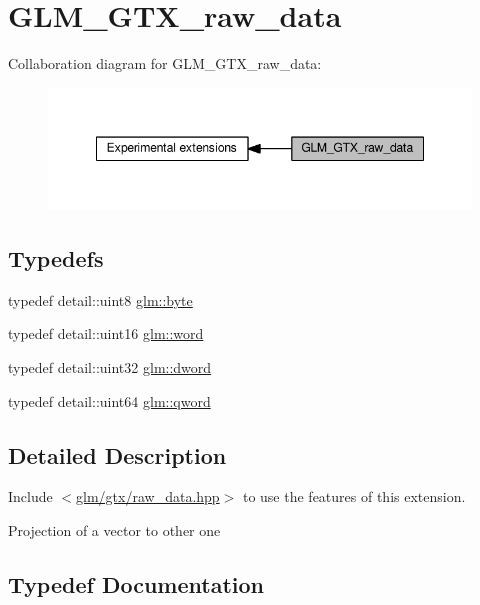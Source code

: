 \hypertarget{group__gtx__raw__data}{}\section{G\+L\+M\+\_\+\+G\+T\+X\+\_\+raw\+\_\+data}
\label{group__gtx__raw__data}
Collaboration diagram for G\+L\+M\+\_\+\+G\+T\+X\+\_\+raw\+\_\+data\+:
\nopagebreak
\begin{figure}[H]
\begin{center}
\leavevmode
\includegraphics[width=348pt]{da/dcd/group__gtx__raw__data}
\end{center}
\end{figure}
\subsection*{Typedefs}
\begin{DoxyCompactItemize}
\item 
typedef detail\+::uint8 \hyperlink{group__gtx__raw__data_gacd7fe1f2ad60a57f7d7ad4f1e6836efd}{glm\+::byte}
\item 
typedef detail\+::uint16 \hyperlink{group__gtx__raw__data_ga5617a479d471021b5c773c5e969ba46d}{glm\+::word}
\item 
typedef detail\+::uint32 \hyperlink{group__gtx__raw__data_ga1fc2589df6d44e923cd1820cf14805cf}{glm\+::dword}
\item 
typedef detail\+::uint64 \hyperlink{group__gtx__raw__data_ga32447af289e879589883c9b7e3be1246}{glm\+::qword}
\end{DoxyCompactItemize}


\subsection{Detailed Description}
Include $<$\hyperlink{raw__data_8hpp}{glm/gtx/raw\+\_\+data.\+hpp}$>$ to use the features of this extension.

Projection of a vector to other one 

\subsection{Typedef Documentation}
\mbox{\label{group__gtx__raw__data_gacd7fe1f2ad60a57f7d7ad4f1e6836efd}} 
